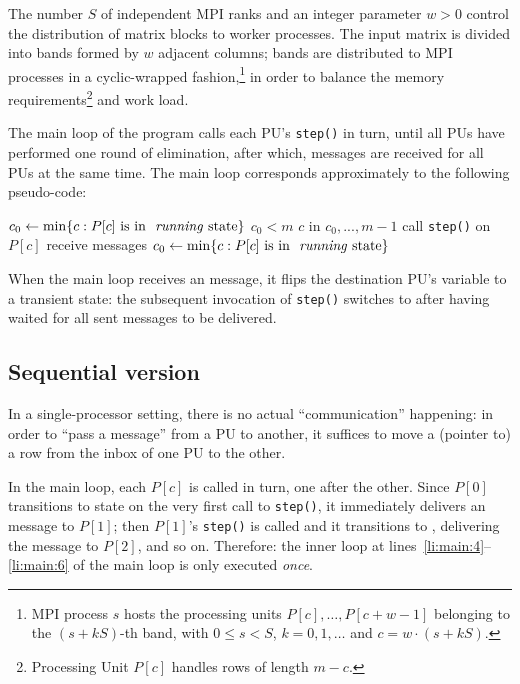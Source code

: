 The number $S$ of independent MPI ranks and an integer parameter
$w > 0$ control the distribution of matrix blocks to worker processes.
The input matrix is divided into bands formed by $w$ adjacent columns;
bands are distributed to MPI processes in a cyclic-wrapped
fashion,\footnote{MPI process $s$ hosts the processing units $P[c],
  \ldots, P[c+w-1]$ belonging to the $(s + kS)$-th band, with $0 \leq
  s < S$, $k=0,1,\ldots$ and $c = w \cdot (s + kS)$.} in order to
balance the memory requirements\footnote{Processing Unit $P[c]$
  handles rows of length $m-c$.} and work load.  

The main loop of the program calls each PU's \verb"step()" in turn,
until all PUs have performed one round of elimination, after which,
messages are received for all PUs at the same time.  The main loop
corresponds approximately to the following pseudo-code:
\begin{codebox}
  \li $c_0 \gets \min\{c : P[c] \text{ is in \id{running} state}\}$
  \li \While $c_0 < m$
  \li \Do
  \li\label{li:main:4}   
        \For $c$ in $c_0, ..., m-1$ 
  \li   \Do
  \li\label{li:main:6}     
          call \texttt{step()} on $P[c]$
        \End
  \li   receive messages
  \li   $c_0 \gets \min\{c : P[c] \text{ is in \id{running} state}\}$
      \End
\end{codebox}
When the main loop receives an  message, it flips the
destination PU's  variable to a transient 
state: the subsequent invocation of \verb"step()" switches 
to  after having waited for all sent messages to be
delivered.

\subsection{Sequential version}
\label{sec:sequential-impl}

In a single-processor setting, there is no actual ``communication''
happening: in order to ``pass a message'' from a PU to another, it
suffices to move a (pointer to) a row from the inbox of one PU to the
other. 

In the main loop, each $P[c]$ is called in turn, one after the other.
Since $P[0]$ transitions to  state on the very first call to
\verb"step()", it immediately delivers an  message to $P[1]$;
then $P[1]$'s \verb"step()" is called and it transitions to ,
delivering the  message to $P[2]$, and so on.  Therefore: the
inner loop at lines~\ref{li:main:4}--\ref{li:main:6} of the main loop
is only executed \emph{once}.

